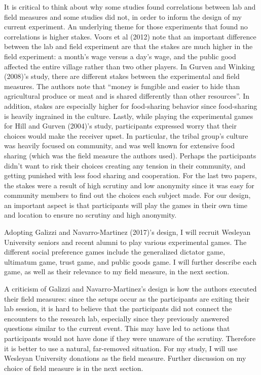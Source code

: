 \documentclass[12pt]{article}
\begin{document}
{\color{red}It is critical to think about why some studies found correlations between lab and field measures and some studies did not, in order to inform the design of my current experiment. An underlying theme for those experiments that found no correlations is higher stakes. Voors et al (2012) note that an important difference between the lab and field experiment are that the stakes are much higher in the field experiment: a month\rq s wage versus a day\rq s wage, and the public good affected the entire village rather than two other players. In Gurven and Winking (2008)\rq s study, there are different stakes between the experimental and field measures. The authors note that ``money is fungible and easier to hide than agricultural produce or meat and is shared differently than other resources''. In addition, stakes are especially higher for food-sharing behavior since food-sharing is heavily ingrained in the culture. Lastly, while playing the experimental games for Hill and Gurven (2004)\rq s study, participants expressed worry that their choices would make the receiver upset. In particular, the tribal group\rq s culture was heavily focused on community, and was well known for extensive food sharing (which was the field measure the authors used). Perhaps the participants didn\rq t want to risk their choices creating any tension in their community, and getting punished with less food sharing and cooperation. For the last two papers, the stakes were a result of high scrutiny and low anonymity since it was easy for community members to find out the choices each subject made. For our design, an important aspect is that participants will play the games in their own time and location to ensure no scrutiny and high anonymity. }

Adopting Galizzi and Navarro-Martinez (2017)'s design, I will recruit Wesleyan University seniors and recent alumni to play various experimental games.  The different social preference games include the generalized dictator game, ultimatum game, trust game, and public goods game. {\color{red}I will further describe each game, as well as their relevance to my field measure, in the next section.}

A criticism of Galizzi and Navarro-Martinez\rq s design is how the authors executed their field measures: since the setups occur as the participants are exiting their lab session, it is hard to believe that the participants did not connect the encounters to the research lab, especially since they previously answered questions similar to the current event. This may have led to actions that participants would not have done if they were unaware of the scrutiny. Therefore it is better to use a natural, far-removed situation. For my study, I will use Wesleyan University donations as the field measure. {\color{red}Further discussion on my choice of field measure is in the next section.}
\end{document}
